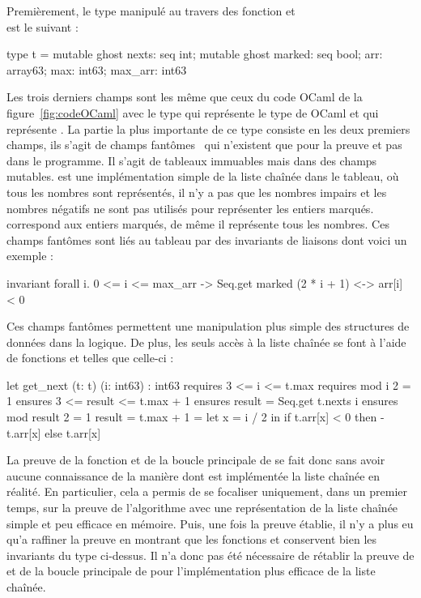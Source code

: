 \documentclass[a4paper]{easychair}
\begin{document}
Premièrement, le type manipulé au travers des fonction 
et \\ est le suivant :
\begin{why3}
type t = {
  mutable ghost nexts: seq int;
  mutable ghost marked: seq bool;
  arr: array63;
  max: int63;
  max_arr: int63
}
\end{why3}

Les trois derniers champs sont les même que ceux du code OCaml de la
figure~\ref{fig:codeOCaml} avec le type  qui représente le type
 de OCaml et  qui représente .
La partie la plus importante de ce type consiste en les deux premiers champs,
ils s'agit de champs fantômes~\cite{ghost-code} qui n'existent que pour la preuve
et pas dans le programme.
Il s'agit de tableaux immuables mais dans des champs mutables.
 est une implémentation simple de la liste chaînée dans le tableau,
où tous les nombres sont représentés, il n'y a pas que les nombres impairs et
les nombres négatifs ne sont pas utilisés pour représenter les entiers marqués.
 correspond aux entiers marqués, de même il représente tous les
nombres.
Ces champs fantômes sont liés au tableau  par des invariants de
liaisons dont voici un exemple :
\begin{why3}
invariant { forall i. 0 <= i <= max_arr ->
                 Seq.get marked (2 * i + 1) <-> arr[i] < 0 }
\end{why3}
Ces champs fantômes permettent une manipulation plus simple des
structures de données dans la logique. De plus, les seuls accès à la liste
chaînée se font à l'aide de fonctions  et  telles que
celle-ci :
\begin{why3}
let get_next (t: t) (i: int63) : int63
  requires { 3 <= i <= t.max }
  requires { mod i 2 = 1 }
  ensures  { 3 <= result <= t.max + 1 }
  ensures  { result = Seq.get t.nexts i }
  ensures  { mod result 2 = 1 \/ result = t.max + 1 }
= let x = i / 2 in
  if t.arr[x] < 0 then - t.arr[x] else t.arr[x]
\end{why3}

La preuve de la fonction  et de la boucle
principale de  se fait donc sans avoir aucune connaissance
de la manière dont est implémentée la liste chaînée en réalité.
En particulier, cela a permis de se focaliser uniquement, dans un premier temps,
sur la preuve de l'algorithme avec une représentation de la liste chaînée
simple et peu efficace en mémoire.
Puis, une fois la preuve établie, il n'y a plus eu qu'a raffiner la preuve en
montrant que les fonctions  et  conservent bien les
invariants du type ci-dessus.
Il n'a donc pas été nécessaire de rétablir la preuve de  et
de la boucle principale de  pour l'implémentation
plus efficace de la liste chaînée.
\end{document}
